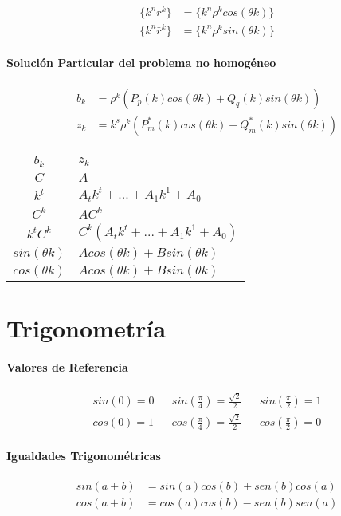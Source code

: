 \documentclass{article}
\begin{document}
\begin{multicols}{2}
        \begin{align*}
          \{k^nr^k \}&= \{k^n\rho^k cos(\theta k)\}\\
          \{k^n\bar{r}^k \} &=\{k^n\rho^k sin(\theta k)\}
        \end{align*}

      \paragraph{Solución Particular del problema no homogéneo}

      \begin{align*}
        b_k &= \rho^k(P_p(k) cos(\theta k) + Q_q(k) sin(\theta k ))\\
        z_k &= k^s\rho^k(P^*_m(k) cos(\theta k) + Q^*_m(k) sin(\theta k ))
      \end{align*}


      \begin{tabular}{c | l}
        $b_k$ & $z_k$ \\ \hline
        $C$ & $A$ \\
        $k^t$ & $A_tk^t + ... + A_1k^1 + A_0$ \\
        $C^k$ & $AC^k$ \\
        $k^tC^k$ & $C^k(A_tk^t + ... + A_1k^1 + A_0)$\\
        $sin(\theta k)$ & $Acos(\theta k) + Bsin(\theta k)$ \\
        $cos(\theta k)$ & $Acos(\theta k) + Bsin(\theta k)$
      \end{tabular}

    \appendix
    \section{Trigonometría}

      \paragraph{Valores de Referencia}

      \begin{align*}
        sin\left(0\right) = 0 && sin\left(\frac{\pi}{4}\right) = \frac{\sqrt{2}}{2} && sin\left(\frac{\pi}{2}\right) = 1 \\
        cos\left(0\right) = 1 && cos\left(\frac{\pi}{4}\right) = \frac{\sqrt{2}}{2} && cos\left(\frac{\pi}{2}\right) = 0
      \end{align*}

      \paragraph{Igualdades Trigonométricas}

      \begin{align*}
        sin(a + b) &= sin(a)cos(b) + sen(b)cos(a) \\
        cos(a + b) &= cos(a)cos(b) - sen(b)sen(a)
      \end{align*}
  \end{multicols}
\end{document}
